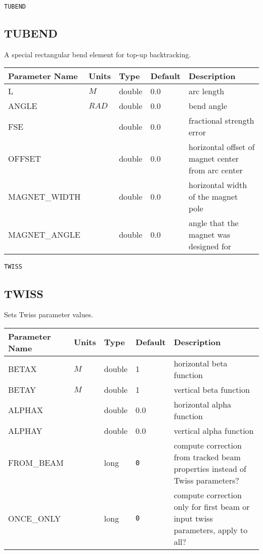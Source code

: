 \vspace*{0.5in}

\begin{latexonly}
\newpage
\begin{center}{\Large\verb|TUBEND|}\end{center}
\end{latexonly}\subsection{TUBEND}
A special rectangular bend element for top-up backtracking.
\\
\begin{tabular}{|l|l|l|l|p{\descwidth}|} \hline
Parameter Name & Units & Type & Default & Description \\ \hline 
L & $M$ & double &  0.0 & arc length  \\ \hline 
ANGLE & $RAD$ & double &  0.0 & bend angle  \\ \hline 
FSE &  & double &  0.0 & fractional strength error  \\ \hline 
OFFSET &  & double &  0.0 & horizontal offset of magnet center from arc center  \\ \hline 
MAGNET\_WIDTH &  & double &  0.0 & horizontal width of the magnet pole  \\ \hline 
MAGNET\_ANGLE &  & double &  0.0 & angle that the magnet was designed for  \\ \hline 
\end{tabular}

\begin{latexonly}
\newpage
\begin{center}{\Large\verb|TWISS|}\end{center}
\end{latexonly}\subsection{TWISS}
Sets Twiss parameter values.
\\
\begin{tabular}{|l|l|l|l|p{\descwidth}|} \hline
Parameter Name & Units & Type & Default & Description \\ \hline 
BETAX & $M$ & double &   1 & horizontal beta function  \\ \hline 
BETAY & $M$ & double &   1 & vertical beta function  \\ \hline 
ALPHAX &  & double &  0.0 & horizontal alpha function  \\ \hline 
ALPHAY &  & double &  0.0 & vertical alpha function  \\ \hline 
FROM\_BEAM &  & long &  \verb|0| & compute correction from tracked beam properties instead of Twiss parameters?  \\ \hline 
ONCE\_ONLY &  & long &  \verb|0| & compute correction only for first beam or input twiss parameters, apply to all?  \\ \hline 
\end{tabular}

